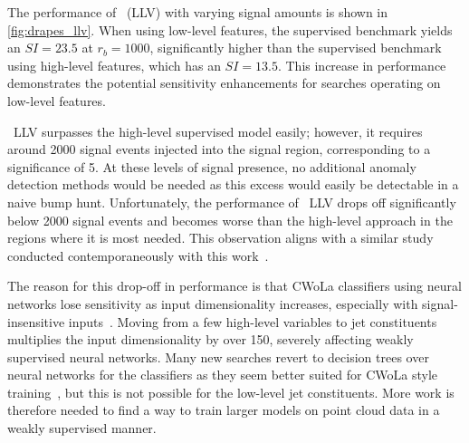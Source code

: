 The performance of \drapes~(LLV) with varying signal amounts is shown in \cref{fig:drapes_llv}.
When using low-level features, the supervised benchmark yields an $SI=23.5$ at $r_b=1000$, significantly higher than the supervised benchmark using high-level features, which has an $SI=13.5$.
This increase in performance demonstrates the potential sensitivity enhancements for searches operating on low-level features.

\drapes~LLV surpasses the high-level supervised model easily; however, it requires around 2000 signal events injected into the signal region, corresponding to a significance of 5.
At these levels of signal presence, no additional anomaly detection methods would be needed as this excess would easily be detectable in a naive bump hunt.
Unfortunately, the performance of \drapes~LLV drops off significantly below 2000 signal events and becomes worse than the high-level approach in the regions where it is most needed.
This observation aligns with a similar study conducted contemporaneously with this work~\cite{FullPhaseSpace}.

The reason for this drop-off in performance is that CWoLa classifiers using neural networks lose sensitivity as input dimensionality increases, especially with signal-insensitive inputs~\cite{lacathode}.
Moving from a few high-level variables to jet constituents multiplies the input dimensionality by over 150, severely affecting weakly supervised neural networks.
Many new searches revert to decision trees over neural networks for the classifiers as they seem better suited for CWoLa style training~\cite{TreebasedAlgorithmsWeakly, AnomalyDetectionPresence}, but this is not possible for the low-level jet constituents.
More work is therefore needed to find a way to train larger models on point cloud data in a weakly supervised manner.

